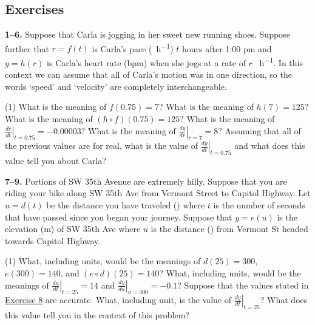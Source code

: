 \documentclass[10pt,oneside,]{book}
\theoremstyle{plain}
\theoremstyle{definition}
\numberwithin{equation}{section}
\newcommand{\fe}[2]{#1\mathopen{}\left(#2\right)\mathclose{}}
\newcommand{\lzoa}[3]{\left.{\frac{d#1}{d#2}}\right|_{#3}}
\begin{document}
\subsection[Exercises]{Exercises}\label{exercises-46}
\textbf{1--6. }\hypertarget{exercisegroup-97}{\null}Suppose that Carla is jogging in her sweet new running shoes. Suppose further that \(r=\fe{f}{t}\) is Carla's pace (\si{\mile\per\hour}) \(t\) hours after 1:00 pm and \(y=\fe{h}{r}\) is Carla's heart rate (bpm) when she jogs at a rate of \(r\) \si{\mile\per\hour}.  In this context we can assume that all of Carla's motion was in one direction, so the words `speed' and `velocity' are completely interchangeable.%
\par
\begin{exercisegroup}(1)
\exercise[1.]\hypertarget{exercise-470}{\null}What is the meaning of \(\fe{f}{0.75}=7\)?%
\exercise[2.]\hypertarget{exercise-471}{\null}What is the meaning of \(\fe{h}{7}=125\)?%
\exercise[3.]\hypertarget{exercise-472}{\null}What is the meaning of \(\fe{\left(h\circ f\right)}{0.75}=125\)?%
\exercise[4.]\hypertarget{exercise-473}{\null}What is the meaning of \(\lzoa{r}{t}{t=0.75}=-0.00003\)?%
\exercise[5.]\hypertarget{exercise-474}{\null}What is the meaning of \(\lzoa{y}{r}{r=7}=8\)?%
\exercise[6.]\hypertarget{exercise-475}{\null}Assuming that all of the previous values are for real, what is the value of \(\lzoa{y}{t}{t=0.75}\) and what does this value tell you about Carla?%
\end{exercisegroup}
\par\smallskip\noindent
\textbf{7--9. }\hypertarget{exercisegroup-98}{\null}Portions of SW 35th Avenue are extremely hilly.  Suppose that you are riding your bike along SW 35th Ave from Vermont Street to Capitol Highway.  Let \(u=\fe{d}{t}\) be the distance you have traveled (\si{\foot}) where \(t\) is the number of seconds that have passed since you began your journey.  Suppose that \(y=\fe{e}{u}\) is the elevation (\si{\meter}) of SW 35th Ave where \(u\) is the distance (\si{\foot}) from Vermont St headed towards Capitol Highway.%
\par
\begin{exercisegroup}(1)
\exercise[7.]\hypertarget{exercise-476}{\null}What, including units, would be the meanings of \(\fe{d}{25}=300\), \(\fe{e}{300}=140\), and \(\fe{\left(e\circ d\right)}{25}=140\)?%
\exercise[8.]\hypertarget{exercise-leibniz-chain-rule}{\null}What, including units, would be the meanings of \(\lzoa{u}{t}{t=25}=14\) and \(\lzoa{y}{u}{u=300}=-0.1\)?%
\exercise[9.]\hypertarget{exercise-478}{\null}Suppose that the values stated in \hyperlink{exercise-leibniz-chain-rule}{Exercise 8} are accurate. What, including unit, is the value of \(\lzoa{y}{t}{t=25}\)? What does this value tell you in the context of this problem?%
\end{exercisegroup}
\end{document}
